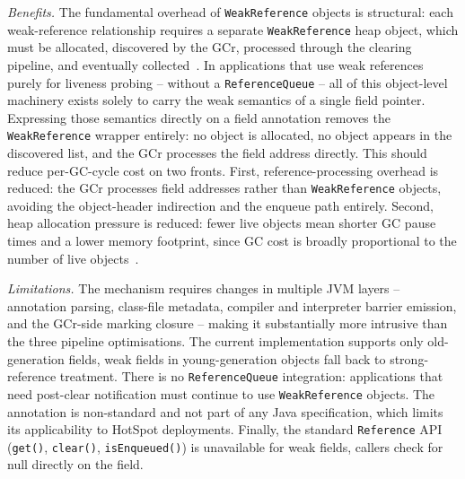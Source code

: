 \emph{Benefits.} The fundamental overhead of \texttt{WeakReference} objects is structural: each weak-reference relationship requires a separate \texttt{WeakReference} heap object, which must be allocated, discovered by the \ac{GCr}, processed through the clearing pipeline, and eventually collected~\cite{openjdk-weakreference-java,openjdk-zreferenceprocessor-cpp}. In applications that use weak references purely for liveness probing -- without a \texttt{ReferenceQueue} -- all of this object-level machinery exists solely to carry the weak semantics of a single field pointer. Expressing those semantics directly on a field annotation removes the \texttt{WeakReference} wrapper entirely: no object is allocated, no object appears in the discovered list, and the \ac{GCr} processes the field address directly. This should reduce per-\ac{GC}-cycle cost on two fronts. First, reference-processing overhead is reduced: the \ac{GCr} processes field addresses rather than \texttt{WeakReference} objects, avoiding the object-header indirection and the enqueue path entirely. Second, heap allocation pressure is reduced: fewer live objects mean shorter \ac{GC} pause times and a lower memory footprint, since \ac{GC} cost is broadly proportional to the number of live objects~\cite{oracle-gc-implementation}.

\emph{Limitations.} The mechanism requires changes in multiple \ac{JVM} layers -- annotation parsing, class-file metadata, compiler and interpreter barrier emission, and the \ac{GCr}-side marking closure -- making it substantially more intrusive than the three pipeline optimisations. The current implementation supports only old-generation fields, weak fields in young-generation objects fall back to strong-reference treatment. There is no \texttt{ReferenceQueue} integration: applications that need post-clear notification must continue to use \texttt{WeakReference} objects. The annotation is non-standard and not part of any Java specification, which limits its applicability to HotSpot deployments. Finally, the standard \texttt{Reference} \ac{API} (\texttt{get()}, \texttt{clear()}, \texttt{isEnqueued()}) is unavailable for weak fields, callers check for null directly on the field.
